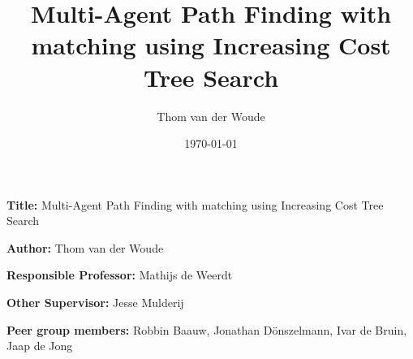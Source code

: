\documentclass[a4paper,10pt,english]{article}
\title{Multi-Agent Path Finding with matching using Increasing Cost Tree Search}
\author{Thom van der Woude}
\date{\today}
\newcommand{\namelistlabel}[1]{\mbox{#1}\hfil}
\newenvironment{namelist}[1]{%
	\begin{list}{}
		{
			\let\makelabel\namelistlabel
			\settowidth{\labelwidth}{#1}
			\setlength{\leftmargin}{1.1\labelwidth}
		}
	}{
\end{list}}
\begin{document}
	\maketitle
	\begin{namelist}{xxxxxxxxxxxxxxxxxxxxxxxxxxxxxxxxxxxxxxx}
		\item[{\bf Title:}]
		Multi-Agent Path Finding with matching using Increasing Cost Tree Search
		\item[{\bf Author:}]
		Thom van der Woude
		\item[{\bf Responsible Professor:}]
		Mathijs de Weerdt
		\item[{\bf Other Supervisor:}]
		Jesse Mulderij
		\item[{\bf Peer group members:}]
		Robbin Baauw, Jonathan Dönszelmann, Ivar de Bruin, Jaap de Jong
	\end{namelist}
	
\end{document}
